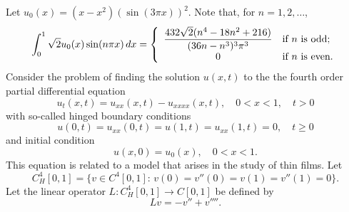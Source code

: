 Let $u_0(x) = (x-x^2) \left(\sin(3\pi x)\right)^2$. Note that, for $n=1,2,\ldots$,
\[
\int_0^1\sqrt{2}u_0(x)\sin(n\pi x)\,dx =\left\{ \begin{array}{cl} \displaystyle{{432\sqrt{2} (n^4-18n^2 + 216) \over (36n-n^3)^3 \pi^3}} & \mbox{if }n\mbox{ is odd}; \\0 & \mbox{if }n\mbox{ is even}.
\end{array}\right.
\]
Consider the problem of finding the solution $u(x,t)$ to the the fourth order partial differential equation
\[
u_t(x,t) = u_{xx}(x,t) - u_{xxxx}(x,t),\quad 0<x<1,\quad t>0
\]
with so-called hinged boundary conditions
\[
u(0,t) = u_{xx}(0,t) = u(1,t) = u_{xx}(1,t) = 0,\quad t\ge0
\]
and initial condition
\[
u(x,0) = u_0(x),\quad 0<x<1.
\]
This equation is related to a model that arises in the study of thin films. Let
\[
C^4_H[0,1] = \{ v \in C^4[0,1]:\, v(0)=v''(0)=v(1)=v''(1)=0\}.
\]
Let the linear operator $L: C^4_H[0,1] \rightarrow C[0,1]$ be defined by
\[
Lv = -v'' + v''''.
\]

